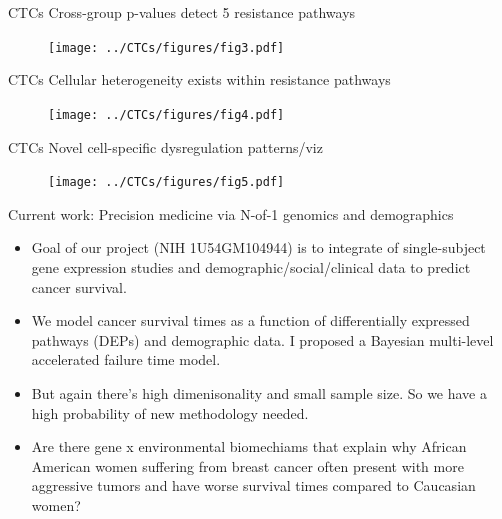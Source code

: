 \documentclass[ignorenonframetext,aspectratio=169,]{beamer}
\begin{document}
\begin{frame}{%
\protect\hypertarget{ctcs-cross-group-p-values-detect-5-resistance-pathways}{%
CTCs Cross-group p-values detect 5 resistance pathways}}

\begin{figure}[htb]
  \centering \texttt{[image: ../CTCs/figures/fig3.pdf]}
\end{figure}

\end{frame}

\begin{frame}{%
\protect\hypertarget{ctcs-cellular-heterogeneity-exists-within-resistance-pathways}{%
CTCs Cellular heterogeneity exists within resistance pathways}}

\begin{figure}[htb]
  \centering \texttt{[image: ../CTCs/figures/fig4.pdf]}
\end{figure}

\end{frame}

\begin{frame}{%
\protect\hypertarget{ctcs-novel-cell-specific-dysregulation-patternsviz}{%
CTCs Novel cell-specific dysregulation patterns/viz}}

\begin{figure}[htb]
  \centering \texttt{[image: ../CTCs/figures/fig5.pdf]}
\end{figure}

\end{frame}

\begin{frame}{%
\protect\hypertarget{current-work-precision-medicine-via-n-of-1-genomics-and-demographics}{%
Current work: Precision medicine via N-of-1 genomics and demographics}}

\begin{itemize}
\item
  Goal of our project (NIH 1U54GM104944) is to integrate of
  single-subject gene expression studies and demographic/social/clinical
  data to predict cancer survival.
\item
  We model cancer survival times as a function of differentially
  expressed pathways (DEPs) and demographic data. I proposed a Bayesian
  multi-level accelerated failure time model.
\item
  But again there’s high dimenisonality and small sample size. So we
  have a high probability of new methodology needed.
\item
  Are there gene x environmental biomechiams that explain why African
  American women suffering from breast cancer often present with more
  aggressive tumors and have worse survival times compared to Caucasian
  women?
\end{itemize}

\end{frame}
\end{document}
